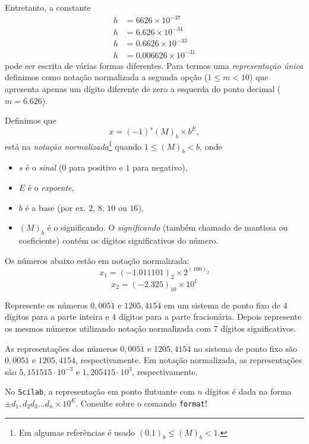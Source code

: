 Entretanto, a constante
\begin{equation*}
  \begin{split}
    h &=6626  \times 10^{-37} \\
    h &=6.626  \times 10^{-34} \\
    h &=0.6626 \times 10^{-33} \\
    h &=0.006626\times 10^{-31}
  \end{split}  
\end{equation*}
pode ser escrita de várias formas diferentes. Para termos uma \emph{representação única} definimos como notação normalizada a segunda opção ($1 \leq m <10$)
que apresenta apenas um dígito  diferente de zero  a esquerda do ponto decimal ($m=6.626$).

\begin{defn}
Definimos que 
 $$ x=(-1)^{s}(M)_b \times b^{E}, $$
está na \emph{notação normalizada}\footnote{Em algumas referências é usado $(0.1)_b\leq (M)_b <1$.} quando $1\leq (M)_{b}<b$, onde
\begin{itemize}
 \item $s$ é o \emph{sinal} ($0$ para positivo e $1$ para negativo),
 \item $E$ é o \emph{expoente},
 \item $b$ é a base (por ex. $2$, $8$, $10$ ou $16$),
 \item $(M)_b$ é o significando. O \emph{significando} (também chamado de mantissa ou coeficiente) contém os dígitos significativos do número.
\end{itemize}
 
\end{defn}


\begin{ex}
  Os números abaixo estão em notação normalizada:
  $$x_1=(-1.011101)_2\times 2^{(100)_2}$$
  $$x_2=(-2.325)_{10}\times  10^{1}$$
\end{ex}

\begin{ex}Represente os números $0,00\overline{51}$ e $1205,41\overline{54}$ em um sistema de ponto fixo de 4 dígitos para a parte inteira e 4 dígitos para a parte fracionária. Depois represente os mesmos números utilizando notação normalizada com 7 dígitos significativos.
\end{ex}
\begin{sol} As representações dos números $0,00\overline{51}$ e $1205,41\overline{54}$ no sistema de ponto fixo são $0,0051$ e $1205,4154$, respectivamente. Em notação normalizada, as representações são $5,151515\cdot 10^{-3}$ e $1,205415 \cdot 10^{3}$, respectivamente.
\end{sol}
\ifisscilab
\begin{obs}
  No \verb+Scilab+, a representação em ponto flutuante com $n$ dígitos é dada na forma $\pm d_1,d_2d_3\ldots d_n\times 10^{E}$. Consulte sobre o comando \verb'format'!
\end{obs}
\fi




